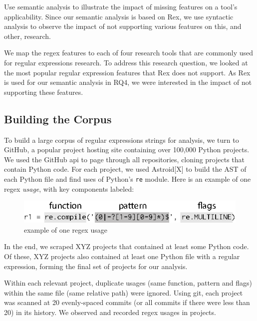 Use semantic analysis to illustrate the impact of missing features on a tool's applicability. Since our semantic analysis is based on Rex, we use syntactic analysis to observe the impact of not supporting various features on this, and other, research. 


We map the regex features to each of four research tools that are commonly used for regular expressions research. 
To address this research question, we looked at the most popular regular expression features that Rex does not support. As Rex is used for our semantic analysis in RQ4, we were interested in the impact of not supporting these features. 





\subsection{Building the Corpus}
\label{study:corpus}
To build a large corpus of regular expressions strings for analysis, we turn to GitHub, a popular project hosting site containing over 100,000 Python projects. 
We used the GitHub api to page through all repositories, cloning projects that contain Python code. 
 For each project, we used Astroid[X] to build the AST of each Python file and find uses of Python's {\tt re} module.  Here is an example of one regex \emph{usage}, with key components labeled:

\begin{figure}[htb]
\centering
\includegraphics[width=\columnwidth]{../illustrations/exampleUsage.eps}
\caption{example of one regex usage}
\label{fig:exampleUsage}
\end{figure}

In the end, we scraped XYZ projects that contained at least some Python code. Of these, XYZ projects also contained at least one Python file with a regular expression, forming the final set of projects for our analysis. 

Within each relevant project, duplicate usages (same function, pattern and flags) within the same file (same relative path) were ignored.  Using git, each project was scanned at 20 evenly-spaced commits (or all commits if there were less than 20) in its history.  We observed and recorded  regex usages in  projects.

